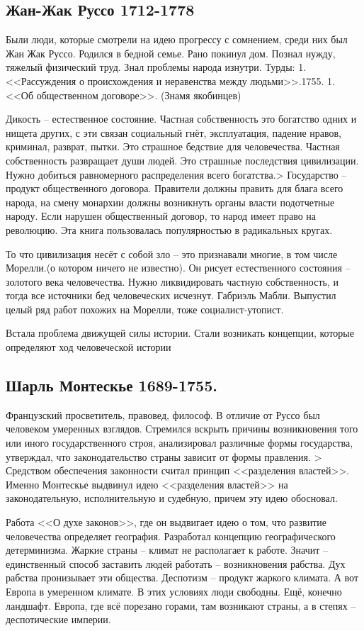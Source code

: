 \subsection{ Жан-Жак Руссо 1712-1778 }

Были люди, которые смотрели на идею прогрессу с сомнением, среди них был Жан Жак Руссо. Родился в бедной семье. Рано покинул дом. Познал нужду, тяжелый физический труд. Знал проблемы народа изнутри. Турды: 1.<<Рассуждения о происхождения и неравенства между людьми>>.1755. 1.<<Об общественном договоре>>. (Знамя якобинцев)

    Дикость – естественное состояние. Частная собственность это богатство одних и нищета других, с эти связан социальный гнёт, эксплуатация, падение нравов, криминал, разврат, пытки. Это страшное бедствие для человечества. Частная собственность развращает души людей. Это страшные последствия цивилизации. Нужно добиться равномерного распределения всего богатства.> Государство – продукт общественного договора. Правители должны править для блага всего народа, на смену монархии должны возникнуть органы власти подотчетные народу. Если нарушен общественный договор, то народ имеет право на революцию. Эта книга пользовалась популярностью в радикальных кругах.

То что цивилизация несёт с собой зло – это признавали многие, в том числе Морелли.(о котором ничего не известно). Он рисует естественного состояния – золотого века человечества. Нужно ликвидировать частную собственность, и тогда все источники бед человеческих исчезнут. Габриэль Мабли. Выпустил целый ряд работ похожих на Морелли, тоже социалист-утопист.

Встала проблема движущей силы истории. Стали возникать концепции, которые определяют ход человеческой истории
\subsection{ Шарль Монтескье 1689-1755. }

Французский просветитель, правовед, философ. В отличие от Руссо был человеком умеренных взглядов. Стремился вскрыть причины возникновения того или иного государственного строя, анализировал различные формы государства, утверждал, что законодательство страны зависит от формы правления. > Средством обеспечения законности считал принцип <<разделения властей>>. Именно Монтескье выдвинул идею <<разделения властей>> на законодательную, исполнительную и судебную, причем эту идею обосновал.

Работа <<О духе законов>>, где он выдвигает идею о том, что развитие человечества определяет география. Разработал концепцию географического детерминизма. Жаркие страны – климат не располагает к работе. Значит – единственный способ заставить людей работать – возникновения рабства. Дух рабства пронизывает эти общества. Деспотизм – продукт жаркого климата. А вот Европа в умеренном климате. В этих условиях люди свободны. Ещё, конечно ландшафт. Европа, где всё порезано горами, там возникают страны, а в степях – деспотические империи.

